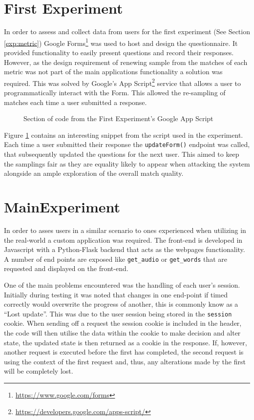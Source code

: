 \section{First Experiment}
In order to assess and collect data from users for the first experiment (See Section \ref{exp:metric}) Google Forms\footnote{\url{https://www.google.com/forms}} was used to host and design the questionnaire. It provided functionality to easily present questions and record their responses. However, as the design requirement of renewing sample from the matches of each metric was not part of the main applications functionality a solution was required. This was solved by Google's App Script\footnote{\url{https://developers.google.com/apps-script/}} service that allows a user to programmatically interact with the Form. This allowed the re-sampling of matches each time a user submitted a response.

\begin{figure}[!h]
  \centering
  
\caption{Section of code from the First Experiment's Google App Script}
\label{fig:GoogleAppScript}
\end{figure}

Figure \ref{fig:GoogleAppScript} contains an interesting snippet from the script used in the experiment. Each time a user submitted their response the \verb|updateForm()| endpoint was called, that subsequently updated the questions for the next user. This aimed to keep the samplings fair as they are equality likely to appear when attacking the system alongside an ample exploration of the overall match quality.

\section{MainExperiment}
In order to asses users in a similar scenario to ones experienced when utilizing \pep in the real-world a custom application was required. The front-end is developed in Javascript with a Python-Flask backend that acts as the webpages functionality. A number of end points are exposed like \verb|get_audio| or \verb|get_words| that are requested and displayed on the front-end.

One of the main problems encountered was the handling of each user's session. Initially during testing it was noted that changes in one end-point if timed correctly would overwrite the progress of another, this is commonly know as a ``Lost update''. This was due to the user session being stored in the \verb|session| cookie. When sending off a request the session cookie is included in the header, the code will then utilise the data within the cookie to make decision and alter state, the updated state is then returned as a cookie in the response. If, however, another request is executed before the first has completed, the second request is using the context of the first request and, thus, any alterations made by the first will be completely lost.

